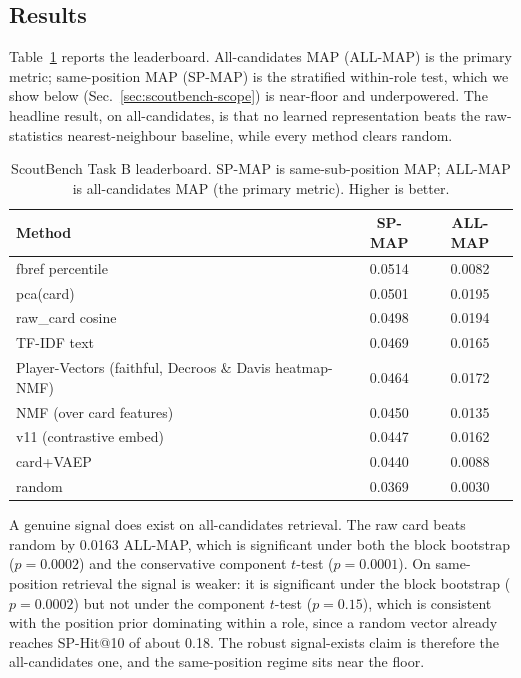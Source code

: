 \subsection{Results}
\label{sec:scoutbench-results}

Table~\ref{tab:leaderboard} reports the leaderboard. All-candidates MAP
(ALL-MAP) is the primary metric; same-position MAP (SP-MAP) is the stratified
within-role test, which we show below (Sec.~\ref{sec:scoutbench-scope}) is
near-floor and underpowered. The headline result, on all-candidates, is that no
learned representation beats the raw-statistics nearest-neighbour baseline,
while every method clears random.

\begin{table}[t]
\centering
\caption{ScoutBench Task B leaderboard. SP-MAP is same-sub-position MAP;
ALL-MAP is all-candidates MAP (the primary metric). Higher is better.}
\label{tab:leaderboard}
\begin{tabular}{lcc}
\toprule
Method & SP-MAP & ALL-MAP \\
\midrule
fbref percentile & 0.0514 & 0.0082 \\
pca(card) & 0.0501 & 0.0195 \\
raw\_card cosine & 0.0498 & 0.0194 \\
TF-IDF text & 0.0469 & 0.0165 \\
Player-Vectors (faithful, Decroos \& Davis heatmap-NMF) & 0.0464 & 0.0172 \\
NMF (over card features) & 0.0450 & 0.0135 \\
v11 (contrastive embed) & 0.0447 & 0.0162 \\
card+VAEP & 0.0440 & 0.0088 \\
random & 0.0369 & 0.0030 \\
\bottomrule
\end{tabular}
\end{table}

A genuine signal does exist on all-candidates retrieval. The raw card beats
random by 0.0163 ALL-MAP, which is significant under both the block bootstrap
($p = 0.0002$) and the conservative component $t$-test ($p = 0.0001$). On
same-position retrieval the signal is weaker: it is significant under the block
bootstrap ($p = 0.0002$) but not under the component $t$-test ($p = 0.15$),
which is consistent with the position prior dominating within a role, since a
random vector already reaches SP-Hit@10 of about 0.18. The robust
signal-exists claim is therefore the all-candidates one, and the same-position
regime sits near the floor.

